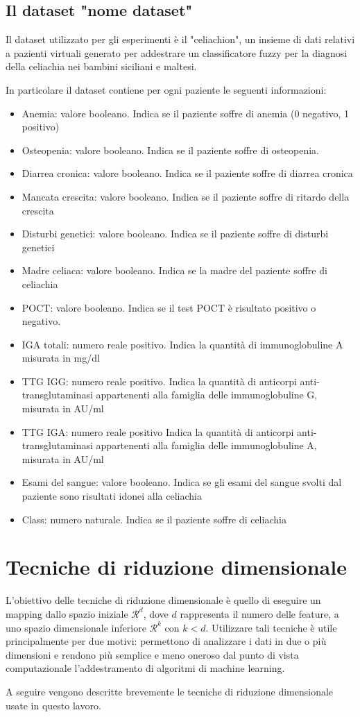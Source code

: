 \documentclass[11pt,a4paper,twocolumn]{article}
\begin{document}
\subsection{Il dataset "nome dataset"}
Il dataset utilizzato per gli esperimenti è il "celiachion", un insieme di dati relativi a pazienti virtuali generato per addestrare un classificatore fuzzy per la diagnosi della celiachia nei bambini siciliani e maltesi.\par
In particolare il dataset contiene per ogni paziente le seguenti informazioni:
\begin{itemize}
	\item Anemia: valore booleano. Indica se il paziente soffre di anemia (0 negativo, 1 positivo)
	\item Osteopenia: valore booleano. Indica se il paziente soffre di osteopenia.
	\item Diarrea cronica: valore booleano. Indica se il paziente soffre di diarrea cronica
	\item Mancata crescita: valore booleano. Indica se il paziente soffre di ritardo della crescita
	\item Disturbi genetici: valore booleano. Indica se il paziente soffre di disturbi genetici
	\item Madre celiaca: valore booleano. Indica se la madre del paziente soffre di celiachia
	\item POCT: valore booleano. Indica se il test POCT è risultato positivo o negativo.
	\item IGA totali: numero reale positivo. Indica la quantità di immunoglobuline A misurata in mg/dl
	\item TTG IGG: numero reale positivo. Indica la quantità di anticorpi anti-transglutaminasi appartenenti alla famiglia delle immunoglobuline G, misurata in AU/ml
	\item TTG IGA: numero reale positivo Indica la quantità di anticorpi anti-transglutaminasi appartenenti alla famiglia delle immunoglobuline A, misurata in AU/ml
	\item Esami del sangue: valore booleano. Indica se gli esami del sangue svolti dal paziente sono risultati idonei alla celiachia
	\item Class: numero naturale. Indica se il paziente soffre di celiachia
\end{itemize}
\section{Tecniche di riduzione dimensionale}
L'obiettivo delle tecniche di riduzione dimensionale è quello di eseguire un mapping dallo spazio iniziale $ \mathcal{R}^d$, dove $ d $ rappresenta il numero delle feature, a uno spazio dimensionale inferiore  $ \mathcal{R}^k$ con $ k<d $. Utilizzare tali tecniche è utile principalmente per due motivi: permettono di analizzare i dati in due o più dimensioni e rendono più semplice e meno oneroso dal punto di vista computazionale l'addestramento di algoritmi di machine learning. \par
A seguire vengono descritte brevemente le tecniche di riduzione dimensionale usate in questo lavoro. 
\end{document}
